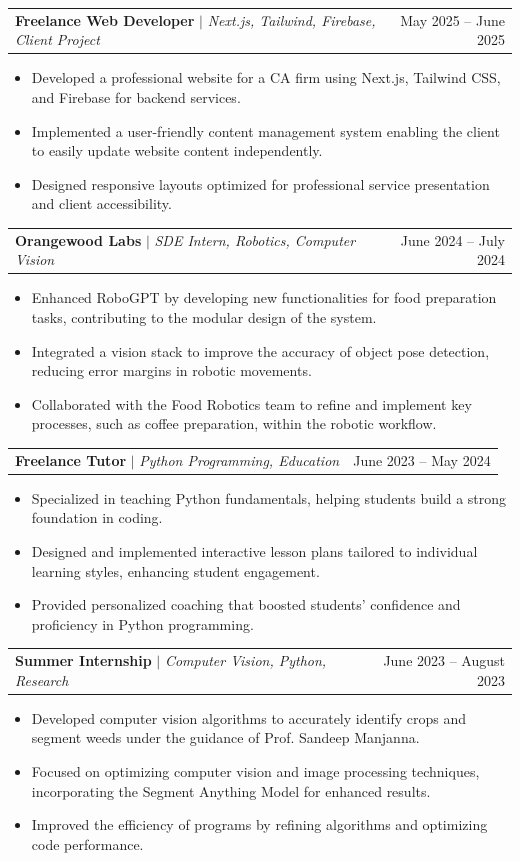 \documentclass[letterpaper,11pt]{article}
\makeatletter
\newcommand{\resumeItem}[1]{\hspace{-2pt}
  \item\small{
    {#1 \vspace{-2pt}}
  }
}
\newcommand{\resumeProjectHeading}[2]{
    \item
    \hspace{-4pt}
    \begin{tabular*}{0.97\textwidth}{l@{\extracolsep{\fill}}r}
      \small#1 & #2 \\
    \end{tabular*}\vspace{-7pt}
}
\newcommand{\resumeItemListStart}{\hspace{-4pt}\begin{itemize}}
\newcommand{\resumeItemListEnd}{\end{itemize}\vspace{-5pt}}
\makeatother
\begin{document}
    \resumeProjectHeading
      {\textbf{Freelance Web Developer} $|$ \footnotesize\emph{Next.js, Tailwind, Firebase, Client Project}}{May 2025 -- June 2025}
      \resumeItemListStart
        \resumeItem{Developed a professional website for a CA firm using Next.js, Tailwind CSS, and Firebase for backend services.}
        \resumeItem{Implemented a user-friendly content management system enabling the client to easily update website content independently.}
        \resumeItem{Designed responsive layouts optimized for professional service presentation and client accessibility.}
      \resumeItemListEnd

    \resumeProjectHeading
      {\textbf{Orangewood Labs} $|$ \footnotesize\emph{SDE Intern, Robotics, Computer Vision}}{June 2024 -- July 2024}
      \resumeItemListStart
        \resumeItem{Enhanced RoboGPT by developing new functionalities for food preparation tasks, contributing to the modular design of the system.}
        \resumeItem{Integrated a vision stack to improve the accuracy of object pose detection, reducing error margins in robotic movements.}
        \resumeItem{Collaborated with the Food Robotics team to refine and implement key processes, such as coffee preparation, within the robotic workflow.}
      \resumeItemListEnd

    \resumeProjectHeading
      {\textbf{Freelance Tutor} $|$ \footnotesize\emph{Python Programming, Education}}{June 2023 -- May 2024}
      \resumeItemListStart
        \resumeItem{Specialized in teaching Python fundamentals, helping students build a strong foundation in coding.}
        \resumeItem{Designed and implemented interactive lesson plans tailored to individual learning styles, enhancing student engagement.}
        \resumeItem{Provided personalized coaching that boosted students' confidence and proficiency in Python programming.}
      \resumeItemListEnd

      \resumeProjectHeading
      {\textbf{Summer Internship} $|$ \footnotesize\emph{Computer Vision, Python, Research}}{June 2023 -- August 2023}
      \resumeItemListStart
        \resumeItem{Developed computer vision algorithms to accurately identify crops and segment weeds under the guidance of Prof. Sandeep Manjanna.}
        \resumeItem{Focused on optimizing computer vision and image processing techniques, incorporating the Segment Anything Model for enhanced results.}
        \resumeItem{Improved the efficiency of programs by refining algorithms and optimizing code performance.}
      \resumeItemListEnd
\end{document}
